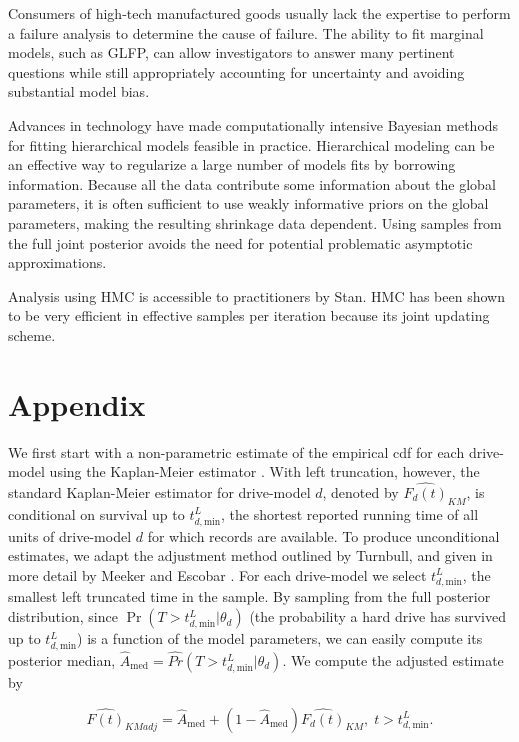 \documentclass[12pt]{article}
\begin{document}
Consumers of high-tech manufactured goods usually lack the expertise to perform a failure analysis to determine the cause of failure. The ability to fit marginal models, such as GLFP, can allow investigators to answer many pertinent questions while still appropriately accounting for uncertainty and avoiding substantial model bias.

Advances in technology have made computationally intensive Bayesian methods for fitting hierarchical models feasible in practice. Hierarchical modeling can be an effective way to regularize a large number of models fits by borrowing information. Because all the data contribute some information about the global parameters, it is often sufficient to use weakly informative priors on the global parameters, making the resulting shrinkage data dependent. Using samples from the full joint posterior avoids the need for potential problematic asymptotic approximations.

Analysis using HMC is accessible to practitioners by Stan. HMC has been shown to be very efficient in effective samples per iteration because its joint updating scheme.

\section{Appendix}
\label{sec:Appendix}
We first start with a non-parametric estimate of the empirical cdf for each drive-model using the Kaplan-Meier estimator
\cite{kaplan}.  With left truncation, however, the standard Kaplan-Meier estimator for drive-model $d$, denoted by
$\widehat{F_d(t)}_{KM}$, is conditional on survival up to
$t_{d,\text{min}}^L$, the shortest reported running time of all units
of drive-model $d$ for which records are available. To produce
unconditional estimates, we adapt the adjustment method outlined by
Turnbull, and given in more detail by Meeker and Escobar
\cite{turnbull,meeker}.  For each drive-model we select
$t_{d,\text{min}}^L$, the smallest left truncated time in the sample.
By sampling from the full posterior distribution, since
$\Pr(T>t_{d,\text{min}}^L|\theta_d)$ (the probability a hard drive has
survived up to $t_{d,\text{min}}^L$) is a function of the model
parameters, we can easily compute its posterior median,
$\widehat{A}_{\text{med}} = \widehat{Pr}(T>t_{d,\text{min}}^L|\theta_d)$. We compute the adjusted estimate by

$$\widehat{F(t)}_{KMadj} = \widehat{A}_{\text{med}} + \left(1 - \widehat{A}_{\text{med}}\right)\widehat{F_d(t)}_{KM},\; t>t_{d,\text{min}}^L.$$
\end{document}
